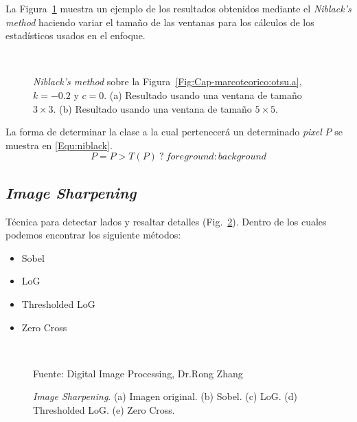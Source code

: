 	La Figura~\ref{Fig:Cap-marcoteorico:niblack} muestra un ejemplo de los 
	resultados obtenidos mediante el \textit{Niblack's method} haciendo variar 
	el tamaño de las ventanas para los cálculos de los estadísticos usados en el
	enfoque. 
		
	\begin{figure}[h!]
	\centering
	\setlength{\fboxsep}{0pt}
   { }
   \\
	\caption[\textit{Niblack's method}]{\textit{Niblack's method} sobre la
	Figura~\ref{Fig:Cap-marcoteorico:otsu.a}, $k=-0.2$ y $c=0$. (a) Resultado
	usando una ventana de tamaño $3\times 3$. (b) Resultado usando una ventana 
	de tamaño $5\times 5$.}
	\label{Fig:Cap-marcoteorico:niblack}
	\end{figure}
	
	La forma de determinar la clase a la cual pertenecerá un determinado
	\textit{pixel} $P$ se muestra en \ref{Equ:niblack}.
	\begin{equation}
		P = P > T(P) ~?~ \textit{foreground} : \textit{background}
		\label{Equ:niblack}
	\end{equation}	
	
\subsection{\textit{Image Sharpening}}
	Técnica para detectar lados y resaltar detalles (Fig.~\ref{Fig:Sharpening}).
Dentro de los cuales podemos encontrar los siguiente métodos:
	\begin{itemize}
		\item Sobel
    \item LoG
    \item Thresholded LoG
    \item Zero Cross
  \end{itemize}

  \begin{figure}[h!]
		\centering
     { }
    \\
     { }
    \caption[\textit{Image Sharpening}]{\textit{Image Sharpening}. (a) Imagen 
    original. (b) Sobel. (c) LoG. (d) Thresholded LoG. (e) Zero Cross.} 
    \tiny{Fuente: Digital Image Processing, Dr.Rong Zhang}
    \label{Fig:Sharpening}
	\end{figure}    

